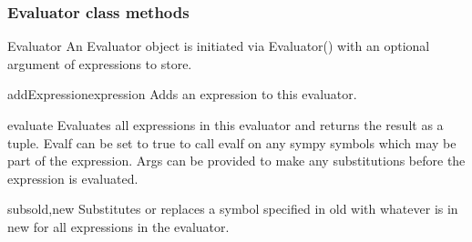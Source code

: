 \subsubsection{Evaluator class methods}
\begin{classdesc}{Evaluator}{}
An Evaluator object is initiated via Evaluator() with an optional argument of expressions to store.
\end{classdesc}
\begin{methoddesc}[Evaluator]{addExpression}{expression}
Adds an expression to this evaluator.
\end{methoddesc}
\begin{methoddesc}[Evaluator]{evaluate}{}
Evaluates all expressions in this evaluator and returns the result as a tuple. Evalf can be set to true to call evalf on any sympy symbols which may be part of the expression.
Args can be provided to make any substitutions before the expression is evaluated.
\end{methoddesc}
\begin{methoddesc}[Evaluator]{subs}{old,new}
Substitutes or replaces a symbol specified in old with whatever is in new for all expressions in the evaluator.
\end{methoddesc}

